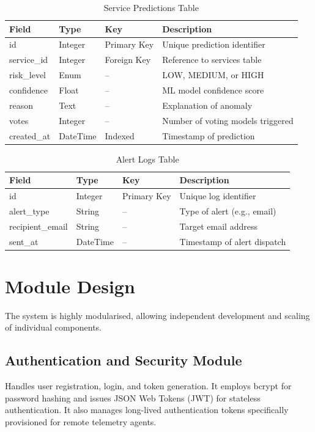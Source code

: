 \documentclass[12pt,a4paper,oneside]{report}
\begin{document}
\begin{table}[H]
\centering
\begin{tabularx}{\textwidth}{|l|l|l|X|}
\hline
\textbf{Field} & \textbf{Type} & \textbf{Key} & \textbf{Description} \\
\hline
id & Integer & Primary Key & Unique prediction identifier \\
service\_id & Integer & Foreign Key & Reference to services table \\
risk\_level & Enum & -- & LOW, MEDIUM, or HIGH \\
confidence & Float & -- & ML model confidence score \\
reason & Text & -- & Explanation of anomaly \\
votes & Integer & -- & Number of voting models triggered \\
created\_at & DateTime & Indexed & Timestamp of prediction \\
\hline
\end{tabularx}
\caption{Service Predictions Table}
\label{tab:predictions}
\end{table}

\begin{table}[H]
\centering
\begin{tabularx}{\textwidth}{|l|l|l|X|}
\hline
\textbf{Field} & \textbf{Type} & \textbf{Key} & \textbf{Description} \\
\hline
id & Integer & Primary Key & Unique log identifier \\
alert\_type & String & -- & Type of alert (e.g., email) \\
recipient\_email & String & -- & Target email address \\
sent\_at & DateTime & -- & Timestamp of alert dispatch \\
\hline
\end{tabularx}
\caption{Alert Logs Table}
\label{tab:alert_logs}
\end{table}

\section{Module Design}
\noindent The system is highly modularised, allowing independent development and scaling of individual components.

\subsection{Authentication and Security Module}
\noindent Handles user registration, login, and token generation. It employs bcrypt for password hashing and issues JSON Web Tokens (JWT) for stateless authentication. It also manages long-lived authentication tokens specifically provisioned for remote telemetry agents.
\end{document}
